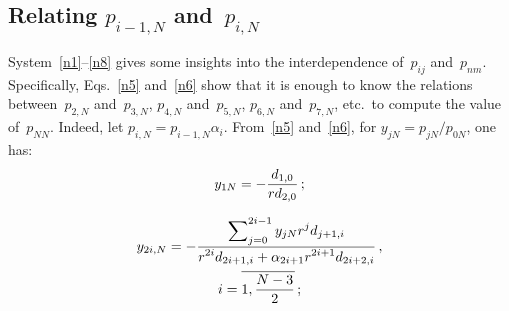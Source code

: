 \begin{multicols}{2}
\section{Relating {{$p_{i-1,N}$}} and~{{$p_{i,N}$}}}

\noindent
System~\eqref{n1}--\eqref{n8}
gives some insights into the interdependence of~$p_{ij}$ and~$p_{nm}$.
Specifically, Eqs.~\eqref{n5} and~\eqref{n6}
show that it is enough to know the relations between~$p_{2,N}$ 
and~$p_{3,N}$, $p_{4,N}$ 
and~$p_{5,N}$, $p_{6,N}$ and~$p_{7,N}$, etc.\ to compute the value of~$p_{NN}$.
Indeed, let $p_{i,N}= p_{i-1,N} \alpha_i$. From~\eqref{n5} and~\eqref{n6},
for $y_{jN}=p_{jN}/p_{0N}$, one has:
\begin{equation}
\label{app1}
y_{1N} =
-\displaystyle\frac{\displaystyle d_{1,0} \mathstrut}{\displaystyle r d_{2,0}\mathstrut}\,;
\end{equation}

\vspace*{-12pt}

\noindent
\begin{multline}
\label{app2}
y_{2i,N} =-\displaystyle\frac{\displaystyle  \sum\nolimits_{j=0}^{2i-1}
y_{jN} r^{j} d_{j+1,i}\mathstrut}{\displaystyle r^{2i} d_{2i+1,i}+\alpha_{2i+1} r^{2i+1} d_{2i+2,i}\mathstrut}\,, \\
 i=\overline{1,\displaystyle\frac{\displaystyle N-3\mathstrut}{\displaystyle 2\mathstrut}}\,;
\end{multline}

\vspace*{-12pt}


\end{multicols}
